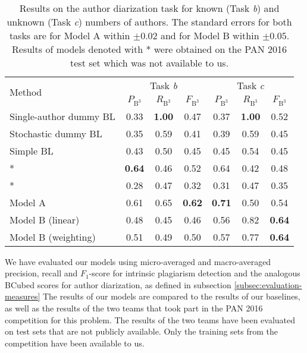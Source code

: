 \documentclass[10pt, a4paper]{article}
\begin{document}
\begin{table*}
	\caption{Results on the author diarization task for known (Task \emph{b}) and unknown (Task \emph{c}) numbers of authors. The standard errors for both tasks are for Model A within $\pm0.02$ and for Model B within $\pm0.05$. Results of models denoted with * were obtained on the PAN 2016 test set which was not available to us.}
	\label{tab:results-task-b-c}
	\begin{center}
		\begin{tabular}{l|ccc|ccc}
			\toprule
			\multirow{2}{*}{Method} & \multicolumn{3}{c|}{Task \emph{b}} & \multicolumn{3}{c}{Task \emph{c}} \\
			\cmidrule{2-7}
			& $P_{\mathrm{B}^3}$ & $R_{\mathrm{B}^3}$ & $F_{\mathrm{B}^3}$ & $P_{\mathrm{B}^3}$ & $R_{\mathrm{B}^3}$ & $F_{\mathrm{B}^3}$ \\
			\midrule
			Single-author dummy BL 		& 0.33 & \textbf{1.00} & 0.47 & 0.37 & \textbf{1.00} & 0.52 \\
			Stochastic dummy BL 		& 0.35 & 0.59 & 0.41 & 0.39 & 0.59 & 0.45 \\
			Simple BL 					& 0.43 & 0.50 & 0.45 & 0.45 & 0.54 & 0.45 \\
			\midrule
			\citet{kuznetsov-2016}*		& \textbf{0.64} & 0.46 & 0.52 & 0.64 & 0.42 & 0.48 \\
			\citet{sittar-2016}* 		& 0.28 & 0.47 & 0.32 & 0.31 & 0.47 & 0.35 \\
			\midrule			
			Model A 					& 0.61 & 0.65 & \textbf{0.62} & \textbf{0.71} & 0.50 & 0.54 \\			
			Model B (linear) 			& 0.48 & 0.45 & 0.46 & 0.56 & 0.82 & \textbf{0.64} \\
			Model B (weighting)			& 0.51 & 0.49 & 0.50 & 0.57 & 0.77 & \textbf{0.64} \\
			\bottomrule
		\end{tabular}
	\end{center}
\end{table*}

We have evaluated our models using micro-averaged and macro-averaged precision, recall and $F_1$-score for intrinsic plagiarism detection and the analogous BCubed scores for author diarization, as defined in subsection \ref{subsec:evaluation-measures} The results of our models are compared to the results of our baselines, as well as the results of the two teams that took part in the PAN 2016 competition for this problem. The results of the two teams have been evaluated on test sets that are not publicly available. Only the training sets from the competition have been available to us.
\end{document}
